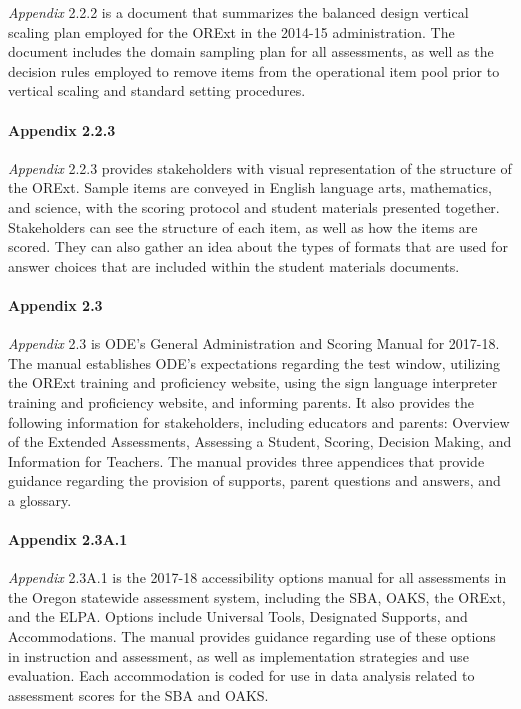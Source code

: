 \documentclass[]{article}
\let\oldparagraph\paragraph
\renewcommand{\paragraph}[1]{\oldparagraph{#1}\mbox{}}
\begin{document}
\emph{Appendix} 2.2.2 is a document that summarizes the balanced design
vertical scaling plan employed for the ORExt in the 2014-15
administration. The document includes the domain sampling plan for all
assessments, as well as the decision rules employed to remove items from
the operational item pool prior to vertical scaling and standard setting
procedures.

\hypertarget{appendix-2.2.3}{%
\paragraph{Appendix 2.2.3}\label{appendix-2.2.3}}

\emph{Appendix} 2.2.3 provides stakeholders with visual representation
of the structure of the ORExt. Sample items are conveyed in English
language arts, mathematics, and science, with the scoring protocol and
student materials presented together. Stakeholders can see the structure
of each item, as well as how the items are scored. They can also gather
an idea about the types of formats that are used for answer choices that
are included within the student materials documents.

\hypertarget{appendix-2.3}{%
\paragraph{Appendix 2.3}\label{appendix-2.3}}

\emph{Appendix} 2.3 is ODE's General Administration and Scoring Manual
for 2017-18. The manual establishes ODE's expectations regarding the
test window, utilizing the ORExt training and proficiency website, using
the sign language interpreter training and proficiency website, and
informing parents. It also provides the following information for
stakeholders, including educators and parents: Overview of the Extended
Assessments, Assessing a Student, Scoring, Decision Making, and
Information for Teachers. The manual provides three appendices that
provide guidance regarding the provision of supports, parent questions
and answers, and a glossary.

\hypertarget{appendix-2.3a.1}{%
\paragraph{Appendix 2.3A.1}\label{appendix-2.3a.1}}

\emph{Appendix} 2.3A.1 is the 2017-18 accessibility options manual for
all assessments in the Oregon statewide assessment system, including the
SBA, OAKS, the ORExt, and the ELPA. Options include Universal Tools,
Designated Supports, and Accommodations. The manual provides guidance
regarding use of these options in instruction and assessment, as well as
implementation strategies and use evaluation. Each accommodation is
coded for use in data analysis related to assessment scores for the SBA
and OAKS.
\end{document}
